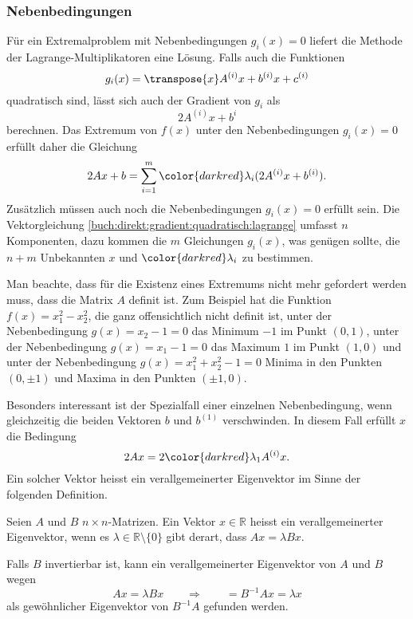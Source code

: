%
%
\subsubsection{Nebenbedingungen}
Für ein Extremalproblem mit Nebenbedingungen $g_i(x)=0$ liefert die
Methode der Lagrange-Multiplikatoren eine Lösung.
Falls auch die Funktionen
\[
g_i(x)
=
\transpose{x}A^{(i)}x + b^{(i)}x + c^{(i)}
\]
quadratisch sind, lässt sich auch der Gradient von $g_i$ als
\[
2A^{(i)}x + b^{i}
\]
berechnen.
Das Extremum von $f(x)$ unter den Nebenbedingungen $g_i(x)=0$ erfüllt
daher die Gleichung
\begin{equation}
2Ax + b
=
\sum_{i=1}^m {\color{darkred}\lambda_i} (2A^{(i)}x+b^{(i)}).
\label{buch:direkt:gradient:quadratisch:lagrange}
\end{equation}
Zusätzlich müssen auch noch die Nebenbedingungen $g_i(x)=0$ erfüllt sein.
Die Vektorgleichung \eqref{buch:direkt:gradient:quadratisch:lagrange}
umfasst $n$ Komponenten, dazu kommen die $m$ Gleichungen $g_i(x)$,
was genügen sollte, die $n+m$ Unbekannten $x$ und ${\color{darkred}\lambda_i}$
zu bestimmen.

Man beachte, dass für die Existenz eines Extremums nicht mehr gefordert
werden muss, dass die Matrix $A$ definit ist.
Zum Beispiel hat die Funktion $f(x) = x_1^2 - x_2^2$, die ganz offensichtlich
nicht definit ist,
unter der Nebenbedingung $g(x)=x_2-1=0$ das Minimum $-1$ im Punkt $(0,1)$,
unter der Nebenbedingung $g(x)=x_1-1=0$ das Maximum $1$ im Punkt $(1,0)$ und
unter der Nebenbedingung $g(x)=x_1^2+x_2^2-1=0$ Minima in den Punkten
$(0,\pm1)$ und Maxima in den Punkten $(\pm1,0)$.

Besonders interessant ist der Spezialfall einer einzelnen Nebenbedingung,
wenn gleichzeitig die beiden Vektoren $b$ und $b^{(1)}$ verschwinden.
In diesem Fall erfüllt $x$ die Bedingung
\[
2Ax=2{\color{darkred}\lambda_1}A^{(i)}x.
\]
Ein solcher Vektor heisst ein verallgemeinerter Eigenvektor im Sinne
der folgenden Definition.

\begin{definition}
%
%
Seien $A$ und $B$ $n\times n$-Matrizen.
Ein Vektor $x\in\mathbb{R}$ heisst ein verallgemeinerter Eigenvektor,
wenn es $\lambda\in\mathbb{R}\setminus \{0\}$ gibt derart, dass
$Ax=\lambda Bx$.
\end{definition}

Falls $B$ invertierbar ist, kann ein verallgemeinerter Eigenvektor von $A$
und $B$ wegen
\[
Ax=\lambda Bx
\qquad\Rightarrow\qquad
=
B^{-1}Ax=\lambda x
\]
als gewöhnlicher Eigenvektor von $B^{-1}A$ gefunden werden.

